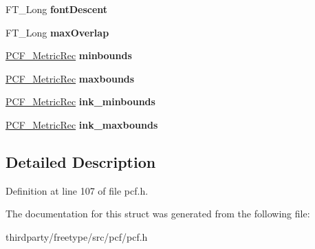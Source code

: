 \begin{DoxyCompactItemize}
\mbox{\label{struct_p_c_f___accel_rec___a51a6465885e07ff0f05181a755922a30}} 
F\+T\+\_\+\+Long {\bfseries font\+Descent}
\item 
\mbox{\label{struct_p_c_f___accel_rec___aedc57e23284e064bb5362f2bfeab1532}} 
F\+T\+\_\+\+Long {\bfseries max\+Overlap}
\item 
\mbox{\label{struct_p_c_f___accel_rec___a63fb8842ee23d3c7a2202e2dc4acd863}} 
\hyperlink{struct_p_c_f___metric_rec__}{P\+C\+F\+\_\+\+Metric\+Rec} {\bfseries minbounds}
\item 
\mbox{\label{struct_p_c_f___accel_rec___acd64b758f76caf4954cc3da64a613a60}} 
\hyperlink{struct_p_c_f___metric_rec__}{P\+C\+F\+\_\+\+Metric\+Rec} {\bfseries maxbounds}
\item 
\mbox{\label{struct_p_c_f___accel_rec___a6f15958b404622ea0f7941e57622314a}} 
\hyperlink{struct_p_c_f___metric_rec__}{P\+C\+F\+\_\+\+Metric\+Rec} {\bfseries ink\+\_\+minbounds}
\item 
\mbox{\label{struct_p_c_f___accel_rec___abe21c2b1c2cd8288b0284468ff0abd78}} 
\hyperlink{struct_p_c_f___metric_rec__}{P\+C\+F\+\_\+\+Metric\+Rec} {\bfseries ink\+\_\+maxbounds}
\end{DoxyCompactItemize}


\subsection{Detailed Description}


Definition at line 107 of file pcf.\+h.



The documentation for this struct was generated from the following file\+:\begin{DoxyCompactItemize}
\item 
thirdparty/freetype/src/pcf/pcf.\+h\end{DoxyCompactItemize}
